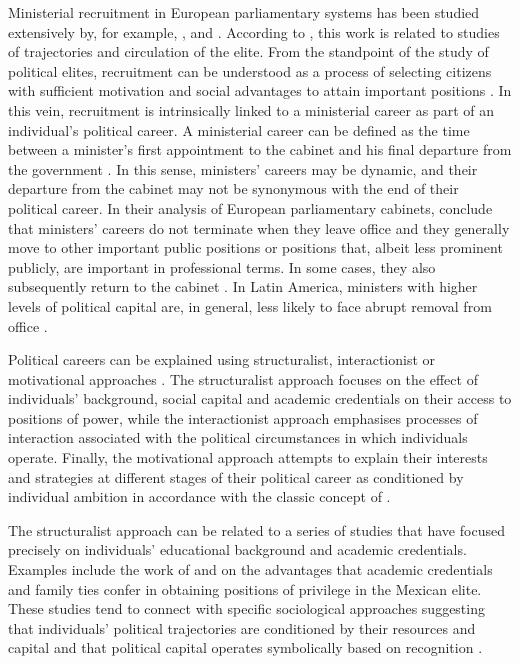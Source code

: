 \documentclass[12pt,halfline,a4paper]{ouparticle}
\begin{document}
Ministerial recruitment in European parliamentary systems has been studied extensively by, for example, \cite{Blondel1988}, \cite{Blondel1997} and \cite{Blondel1991}. According to \cite{Camerlo2018}, this work is related to studies of trajectories and circulation of the elite. From the standpoint of the study of political elites, recruitment can be understood as a process of selecting citizens with sufficient motivation and social advantages to attain important positions \citep{Putnam1976}. In this vein, recruitment is intrinsically linked to a ministerial career as part of an individual’s political career. A ministerial career can be defined as the time between a minister’s first appointment to the cabinet and his final departure from the government \citep{RodriguezTeruel2011}. In this sense, ministers’ careers may be dynamic, and their departure from the cabinet may not be synonymous with the end of their political career. In their analysis of European parliamentary cabinets, \cite{Blondel1993, Blondel1997} conclude that ministers’ careers do not terminate when they leave office and they generally move to other important public positions or positions that, albeit less prominent publicly, are important in professional terms. In some cases, they also subsequently return to the cabinet \citep{GonzalezBustamante2018}. In Latin America, ministers with higher levels of political capital are, in general, less likely to face abrupt removal from office \citep{EscobarLemmon2005, EscobarLemmon2009}.

Political careers can be explained using structuralist, interactionist or motivational approaches \citep{Alcantara1997}. The structuralist approach focuses on the effect of individuals’ background, social capital and academic credentials on their access to positions of power, while the interactionist approach emphasises processes of interaction associated with the political circumstances in which individuals operate. Finally, the motivational approach attempts to explain their interests and strategies at different stages of their political career as conditioned by individual ambition in accordance with the classic concept of \cite{Schlesinger1966}.

The structuralist approach can be related to a series of studies that have focused precisely on individuals’ educational background and academic credentials. Examples include the work of \cite{EscobarLemmon2016} and \cite{AiCamp1995, AiCamp2002} on the advantages that academic credentials and family ties confer in obtaining positions of privilege in the Mexican elite. These studies tend to connect with specific sociological approaches suggesting that individuals’ political trajectories are conditioned by their resources and capital \citep{Joignant2012} and that political capital operates symbolically based on recognition \citep{French2011}.
\end{document}

